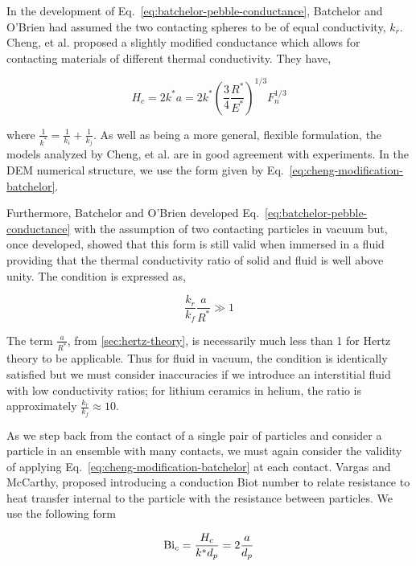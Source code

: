 In the development of Eq.~\ref{eq:batchelor-pebble-conductance}, Batchelor and O'Brien had assumed the two contacting spheres to be of equal conductivity, $k_r$. Cheng, et al.\cite{Cheng19994199} proposed a slightly modified conductance which allows for contacting materials of different thermal conductivity. They have,

\begin{equation}\label{eq:cheng-modification-batchelor}
	H_c = 2k^*a = 2k^* \left(\frac{3}{4}\frac{R^*}{E^*}\right)^{1/3}F_n^{1/3}
\end{equation}

where $\frac{1}{k^*} = \frac{1}{k_i} + \frac{1}{k_j}$. As well as being a more general, flexible formulation, the models analyzed by Cheng, et al.\cite{Cheng19994199} are in good agreement with experiments. In the DEM numerical structure, we use the form given by Eq.~\ref{eq:cheng-modification-batchelor}.

Furthermore, Batchelor and O'Brien developed Eq.~\ref{eq:batchelor-pebble-conductance} with the assumption of two contacting particles in vacuum but, once developed, showed\cite{Batchelor1977} that this form is still valid when immersed in a fluid providing that the thermal conductivity ratio of solid and fluid is well above unity. The condition is expressed as,

\begin{equation}\label{eq:conductance-validity-fluid}
	\frac{ k_r }{ k_f } \frac{a}{R^*} \gg 1
\end{equation}

The term $\frac{a}{R^*}$, from \cref{sec:hertz-theory}, is necessarily much less than 1 for Hertz theory to be applicable. Thus for fluid in vacuum, the condition is identically satisfied but we must consider inaccuracies if we introduce an interstitial fluid with low conductivity ratios; for lithium ceramics in helium, the ratio is approximately $\frac{k_r}{k_f} \approx 10$.

As we step back from the contact of a single pair of particles and consider a particle in an ensemble with many contacts, we must again consider the validity of applying Eq.~\ref{eq:cheng-modification-batchelor} at each contact. Vargas and McCarthy\cite{Vargas2002a}, proposed introducing a conduction Biot number to relate resistance to heat transfer internal to the particle with the resistance between particles. We use the following form

\begin{equation}
	\mathrm{Bi}_c = \frac{H_c}{k^* d_p} = 2\frac{a}{d_p}
\end{equation}

